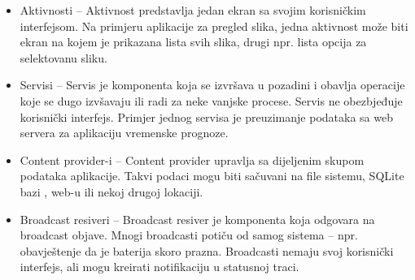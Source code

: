 \documentclass[12pt, a4paper]{report}
\theoremstyle{definition}
\begin{document}
\begin{itemize}
	\item Aktivnosti – Aktivnost predstavlja jedan ekran sa svojim korisničkim interfejsom. Na primjeru aplikacije za pregled slika, jedna aktivnost može biti ekran na kojem je prikazana lista svih slika, drugi npr. lista opcija za selektovanu sliku.
	\item Servisi – Servis je komponenta koja se izvršava u pozadini i obavlja operacije koje se dugo izvšavaju ili radi za neke vanjske procese. Servis ne obezbjeđuje korisnički interfejs. Primjer jednog servisa je preuzimanje podataka sa web servera za aplikaciju vremenske prognoze.
	\item Content provider-i – Content provider upravlja sa dijeljenim skupom podataka aplikacije. Takvi podaci mogu biti sačuvani na file sistemu, SQLite bazi , web-u ili nekoj drugoj lokaciji.
	\item Broadcast resiveri – Broadcast resiver je komponenta koja odgovara na broadcast objave. Mnogi broadcasti potiču od samog sistema – npr. obavještenje da je baterija skoro prazna. Broadcasti nemaju svoj korisnički interfejs, ali mogu kreirati notifikaciju u statusnoj traci.
\end{itemize}
\end{document}
